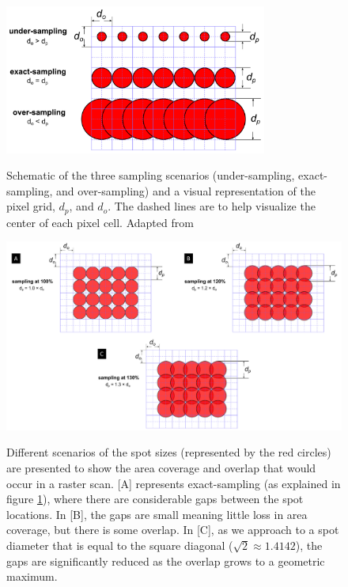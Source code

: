 \documentclass[12pt]{article}
\begin{document}
\begin{figure}[h!]
\begin{center}
{
 \includegraphics[width=0.77\textwidth]{figures/sampling.png}
}
\caption{\label{fig_sampling} Schematic of the three sampling scenarios (under-sampling, exact-sampling, and over-sampling) and a visual representation of the pixel grid, $d_p$, and $d_o$. The dashed lines are to help visualize the center of each pixel cell. Adapted from \citet{lifshin_improving_2014}}
\end{center}
\end{figure}

\begin{landscape}
\setlength{\belowcaptionskip}{-30pt}
\vspace*{\fill}
\begin{figure}[h!]
\begin{center}
{
 \includegraphics[width=1.3\textwidth]{figures/spot_ratio/sampling_ratios.pdf}
}
\caption{\label{fig_samp_ratios} Different scenarios of the spot sizes (represented by the red circles) are presented to show the area coverage and overlap that would occur in a raster scan. [A] represents exact-sampling (as explained in figure \ref{fig_sampling}), where there are considerable gaps between the spot locations. In [B], the gaps are small meaning little loss in area coverage, but there is some overlap. In [C], as we approach to a spot diameter that is equal to the square diagonal ($\sqrt{2} \approx 1.4142$), the gaps are significantly reduced as the overlap grows to a geometric maximum.}
\end{center}
\end{figure}
\vspace*{\fill}
\setlength{\belowcaptionskip}{10pt}
\end{landscape}
\end{document}
